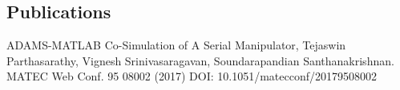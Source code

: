 \documentclass[margin,line]{res}
\begin{document}
\begin{resume}
\section {\sc Publications}
\textbullet\hspace{0.005cm} ADAMS-MATLAB Co-Simulation of A Serial Manipulator, Tejaswin  Parthasarathy, Vignesh Srinivasaragavan, Soundarapandian  Santhanakrishnan. MATEC Web Conf. 95 08002 (2017) DOI: 10.1051/matecconf/20179508002
\end{resume}
\end{document}
